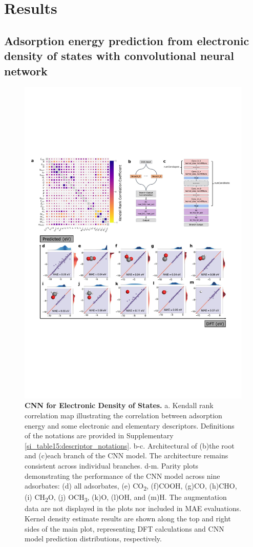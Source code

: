
\section{Results}

\subsection{Adsorption energy prediction from electronic density of states with convolutional neural network}

\begin{figure}[htbp]
    \centering
    \includegraphics[width=0.7\linewidth]{main_fig2_cnn.JPG}
    \caption{\textbf{CNN for Electronic Density of States.}
    a. Kendall rank correlation map illustrating the correlation between adsorption energy
    and some electronic and elementary descriptors.
    Definitions of the notations are provided in Supplementary \cref{si_table15:descriptor_notations}.
    b-c. Architectural of (b)the root and (c)each branch of the CNN model.
    The architecture remains consistent across individual branches.
    d-m. Parity plots demonstrating the performance of the CNN model across nine adsorbates:
    (d) all adsorbates, (e) CO\textsubscript{2}, (f)COOH, (g)CO, (h)CHO,
    (i) CH\textsubscript{2}O, (j) OCH\textsubscript{3}, (k)O, (l)OH, and (m)H.
    The augmentation data are not displayed in the plots nor included in MAE evaluations.
    Kernel density estimate results are shown along the top and right sides of the main plot,
    representing DFT calculations and CNN model prediction distributions, respectively.}
    \label{main_fig2:cnn_for_eads}
\end{figure}

